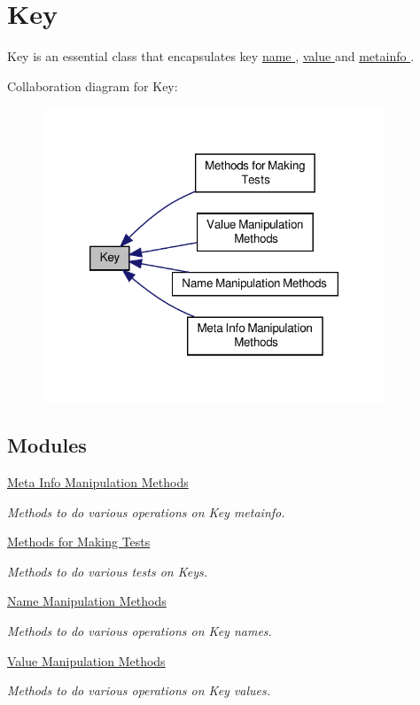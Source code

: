 \hypertarget{group__key}{\section{Key}
\label{group__key}
}


Key is an essential class that encapsulates key \hyperlink{group__keyname}{name }, \hyperlink{group__keyvalue}{value } and \hyperlink{group__keymeta}{metainfo }.  


Collaboration diagram for Key\-:
\nopagebreak
\begin{figure}[H]
\begin{center}
\leavevmode
\includegraphics[width=290pt]{group__key}
\end{center}
\end{figure}
\subsection*{Modules}
\begin{DoxyCompactItemize}
\item 
\hyperlink{group__keymeta}{Meta Info Manipulation Methods}
\begin{DoxyCompactList}\small\item\em Methods to do various operations on Key metainfo. \end{DoxyCompactList}\item 
\hyperlink{group__keytest}{Methods for Making Tests}
\begin{DoxyCompactList}\small\item\em Methods to do various tests on Keys. \end{DoxyCompactList}\item 
\hyperlink{group__keyname}{Name Manipulation Methods}
\begin{DoxyCompactList}\small\item\em Methods to do various operations on Key names. \end{DoxyCompactList}\item 
\hyperlink{group__keyvalue}{Value Manipulation Methods}
\begin{DoxyCompactList}\small\item\em Methods to do various operations on Key values. \end{DoxyCompactList}\end{DoxyCompactItemize}

